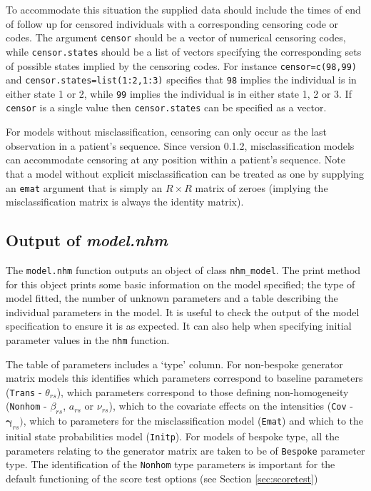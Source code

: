 \documentclass{article}
\numberwithin{equation}{section}
\begin{document}
To accommodate this situation the supplied data should include the times of end of follow up for censored individuals with a corresponding censoring code or codes. The argument \verb!censor! should be a vector of numerical censoring codes, while \verb!censor.states! should be a list of vectors specifying the corresponding sets of possible states implied by the censoring codes. For instance
\verb!censor=c(98,99)! and \verb!censor.states=list(1:2,1:3)! specifies that \verb!98! implies the individual is in either state 1 or 2, while \verb!99! implies the individual is in either state 1, 2 or 3. If  \verb!censor! is a single value then \verb!censor.states! can be specified as a vector.

For models without misclassification, censoring can only occur as the last observation in a patient's sequence. Since version 0.1.2, misclassification models can accommodate censoring at any position within a patient's sequence. Note that a model without explicit misclassification can be treated as one by supplying an \verb!emat! argument that is simply an $R \times R$ matrix of zeroes (implying the misclassification matrix is always the identity matrix).

\subsection{Output of {\it model.nhm}}

The \verb!model.nhm! function outputs an object of class \verb!nhm_model!. The print method for this object prints some basic information on the model specified; the type of model fitted, the number of unknown parameters and a table describing the individual parameters in the model. It is useful to check the output of the model specification to ensure it is as expected. It can also help when specifying initial parameter values in the \verb!nhm! function.

The table of parameters includes a `type' column. For non-bespoke generator matrix models this identifies which parameters correspond to baseline parameters (\verb!Trans! - $\theta_{rs}$), which parameters correspond to those defining non-homogeneity (\verb!Nonhom! - $\beta_{rs}$, $a_{rs}$ or $\nu_{rs}$), which to the covariate effects on the intensities (\verb!Cov! - $\bm\gamma_{rs})$, which to parameters for the misclassification model (\verb!Emat!) and which to the initial state probabilities model (\verb!Initp!). For models of bespoke type, all the parameters relating to the generator matrix are taken to be of \verb!Bespoke! parameter type.
The identification of the \verb!Nonhom! type parameters is important for the default functioning of the score test options (see Section \ref{sec:scoretest})
\end{document}
